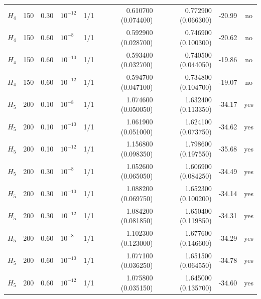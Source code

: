 \begin{longtable}{lrrlrrrrc}
$H_4$ & 150 & 0.30 & $10^{-12}$ & 1/1 & 0.610700 (0.074400) & 0.772900 (0.066300) & -20.99 & no\\
$H_4$ & 150 & 0.60 & $10^{-8}$ & 1/1 & 0.592900 (0.028700) & 0.746900 (0.100300) & -20.62 & no\\
$H_4$ & 150 & 0.60 & $10^{-10}$ & 1/1 & 0.593400 (0.032700) & 0.740500 (0.044050) & -19.86 & no\\
$H_4$ & 150 & 0.60 & $10^{-12}$ & 1/1 & 0.594700 (0.047100) & 0.734800 (0.104700) & -19.07 & no\\
$H_5$ & 200 & 0.10 & $10^{-8}$ & 1/1 & 1.074600 (0.050050) & 1.632400 (0.113350) & -34.17 & yes\\
$H_5$ & 200 & 0.10 & $10^{-10}$ & 1/1 & 1.061900 (0.051000) & 1.624100 (0.073750) & -34.62 & yes\\
$H_5$ & 200 & 0.10 & $10^{-12}$ & 1/1 & 1.156800 (0.098350) & 1.798600 (0.197550) & -35.68 & yes\\
$H_5$ & 200 & 0.30 & $10^{-8}$ & 1/1 & 1.052600 (0.065050) & 1.606900 (0.084250) & -34.49 & yes\\
$H_5$ & 200 & 0.30 & $10^{-10}$ & 1/1 & 1.088200 (0.069750) & 1.652300 (0.100200) & -34.14 & yes\\
$H_5$ & 200 & 0.30 & $10^{-12}$ & 1/1 & 1.084200 (0.081850) & 1.650400 (0.119850) & -34.31 & yes\\
$H_5$ & 200 & 0.60 & $10^{-8}$ & 1/1 & 1.102300 (0.123000) & 1.677600 (0.146600) & -34.29 & yes\\
$H_5$ & 200 & 0.60 & $10^{-10}$ & 1/1 & 1.077100 (0.036250) & 1.651500 (0.064550) & -34.78 & yes\\
$H_5$ & 200 & 0.60 & $10^{-12}$ & 1/1 & 1.075800 (0.035150) & 1.645000 (0.135700) & -34.60 & yes\\
\end{longtable}
\endgroup
